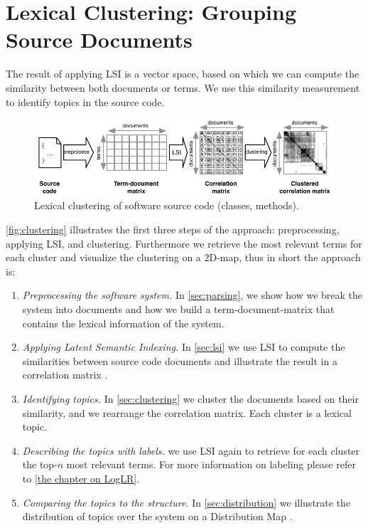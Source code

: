 \section{Lexical Clustering: Grouping Source Documents}\label{sec:sekla}

The result of applying LSI is a vector space, based on which we can compute the similarity between both documents or terms. We use this similarity measurement to identify topics in the source code.

\begin{figure}[htb]
\begin{center}
\includegraphics[width=.8\columnwidth]{fig/hapax-clustering}
\caption{Lexical clustering of software source code (\eg classes, methods).}
\label{fig:clustering}
\end{center}
\end{figure}

\autoref{fig:clustering} illustrates the first three steps of the approach: preprocessing, applying LSI, and clustering. Furthermore we retrieve the most relevant terms for each cluster and visualize the clustering on a 2D-map, thus in short the approach is:

\begin{enumerate}
  \item \emph{Preprocessing the software system.} In \autoref{sec:parsing}, we show how we break the system into documents and how we build a term-document-matrix that contains the lexical information of the system.
  \item \emph{Applying Latent Semantic Indexing.} In \autoref{sec:lsi} we use LSI to compute the similarities between source code documents and illustrate the result in a correlation matrix \cite{Ling73a}.
  \item \emph{Identifying topics.} In \autoref{sec:clustering} we cluster the documents based on their similarity, and we rearrange the correlation matrix. Each cluster is a lexical topic.
  \item \emph{Describing the topics with labels.} we use LSI again to retrieve for each cluster the top-$n$ most relevant terms. For more information on labeling please refer to \autoref{the chapter on LogLR}.
  \item \emph{Comparing the topics to the structure.} In \autoref{sec:distribution} we illustrate the distribution of topics over the system on a Distribution Map \cite{Duca06c}.
\end{enumerate}

